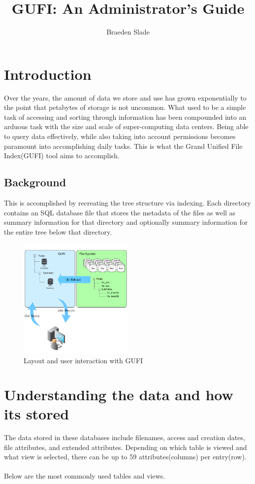 \documentclass{article}
\title{GUFI: An Administrator's Guide}
\author{Braeden Slade}
\begin{document}
\maketitle

\section{Introduction}
Over the years, the amount of data we store and use has grown exponentially to the point that petabytes of storage is not uncommon. What used to be a simple task of accessing and sorting through information has been compounded into an arduous task with the size and scale of super-computing data centers. Being able to query data effectively, while also taking into account permissions becomes paramount into accomplishing daily tasks. This is what the Grand Unified File Index(GUFI) tool aims to accomplish.  

\subsection{Background}
This is accomplished by recreating the tree structure via indexing. Each directory contains an SQL database file that stores the metadata of the files as well as summary information for that directory and optionally summary information for the entire tree below that directory.

\begin{figure} [h]
\centering
\includegraphics[width=0.5\textwidth]{gufi_structure.png}
\caption{\label{fig:gufi\_structure}Layout and user interaction with GUFI}
\end{figure}

\clearpage

\section{Understanding the data and how its stored}
The data stored in these databases include filenames, access and creation dates, file attributes, and extended attributes. Depending on which table is viewed and what view is selected, there can be up to 59 attributes(columns) per entry(row).\\
\\
Below are the most commonly used tables and views. 
\end{document}
